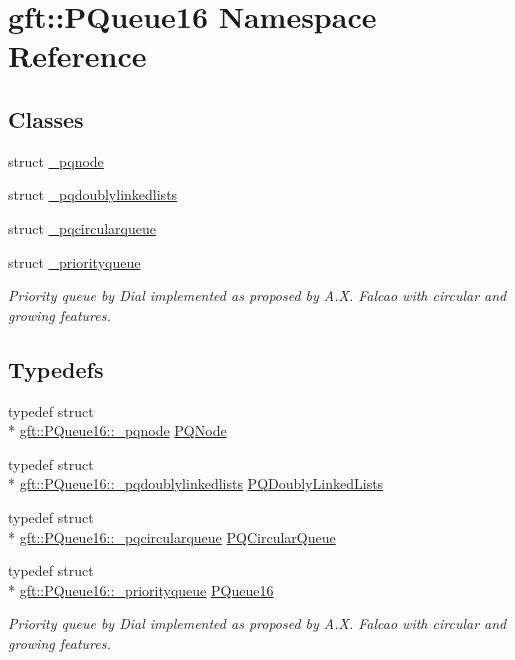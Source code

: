 \hypertarget{namespacegft_1_1PQueue16}{\section{gft\-:\-:P\-Queue16 Namespace Reference}
\label{namespacegft_1_1PQueue16}
}
\subsection*{Classes}
\begin{DoxyCompactItemize}
\item 
struct \hyperlink{structgft_1_1PQueue16_1_1__pqnode}{\-\_\-pqnode}
\item 
struct \hyperlink{structgft_1_1PQueue16_1_1__pqdoublylinkedlists}{\-\_\-pqdoublylinkedlists}
\item 
struct \hyperlink{structgft_1_1PQueue16_1_1__pqcircularqueue}{\-\_\-pqcircularqueue}
\item 
struct \hyperlink{structgft_1_1PQueue16_1_1__priorityqueue}{\-\_\-priorityqueue}
\begin{DoxyCompactList}\small\item\em Priority queue by Dial implemented as proposed by A.\-X. Falcao with circular and growing features. \end{DoxyCompactList}\end{DoxyCompactItemize}
\subsection*{Typedefs}
\begin{DoxyCompactItemize}
\item 
typedef struct \\*
\hyperlink{structgft_1_1PQueue16_1_1__pqnode}{gft\-::\-P\-Queue16\-::\-\_\-pqnode} \hyperlink{namespacegft_1_1PQueue16_a2dc28c8f2a9eaeb5d7d7ae7ec5429314}{P\-Q\-Node}
\item 
typedef struct \\*
\hyperlink{structgft_1_1PQueue16_1_1__pqdoublylinkedlists}{gft\-::\-P\-Queue16\-::\-\_\-pqdoublylinkedlists} \hyperlink{namespacegft_1_1PQueue16_a2e506a5582bb0b3b911d561e82164a46}{P\-Q\-Doubly\-Linked\-Lists}
\item 
typedef struct \\*
\hyperlink{structgft_1_1PQueue16_1_1__pqcircularqueue}{gft\-::\-P\-Queue16\-::\-\_\-pqcircularqueue} \hyperlink{namespacegft_1_1PQueue16_a9170c804b2c99b8035274bfc820f968e}{P\-Q\-Circular\-Queue}
\item 
typedef struct \\*
\hyperlink{structgft_1_1PQueue16_1_1__priorityqueue}{gft\-::\-P\-Queue16\-::\-\_\-priorityqueue} \hyperlink{namespacegft_1_1PQueue16_afab9efb91a79a40b6b74c53c0c19da3d}{P\-Queue16}
\begin{DoxyCompactList}\small\item\em Priority queue by Dial implemented as proposed by A.\-X. Falcao with circular and growing features. \end{DoxyCompactList}\end{DoxyCompactItemize}
